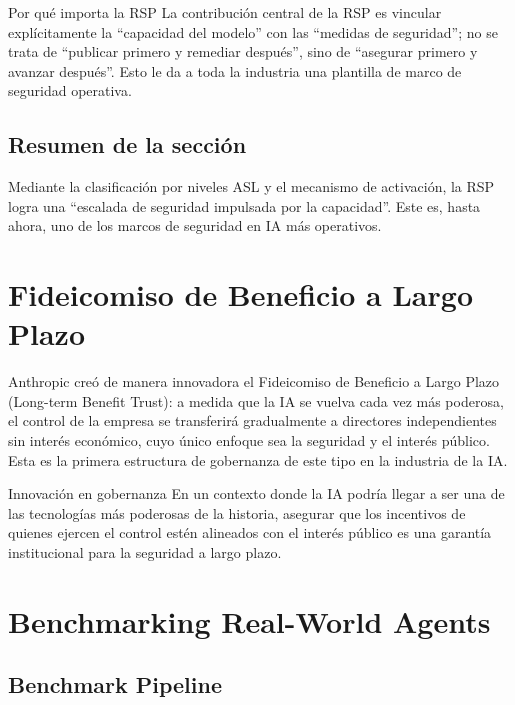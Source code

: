 \documentclass[a4paper]{article}
\begin{document}
\begin{knowledgebox}{Por qué importa la RSP}
La contribución central de la RSP es vincular explícitamente la ``capacidad del modelo'' con las ``medidas de seguridad''; no se trata de ``publicar primero y remediar después'', sino de ``asegurar primero y avanzar después''. Esto le da a toda la industria una plantilla de marco de seguridad operativa.
\end{knowledgebox}

\subsection{Resumen de la sección}

Mediante la clasificación por niveles ASL y el mecanismo de activación, la RSP logra una ``escalada de seguridad impulsada por la capacidad''. Este es, hasta ahora, uno de los marcos de seguridad en IA más operativos.

\section{Fideicomiso de Beneficio a Largo Plazo}

Anthropic creó de manera innovadora el Fideicomiso de Beneficio a Largo Plazo (Long-term Benefit Trust): a medida que la IA se vuelva cada vez más poderosa, el control de la empresa se transferirá gradualmente a directores independientes sin interés económico, cuyo único enfoque sea la seguridad y el interés público. Esta es la primera estructura de gobernanza de este tipo en la industria de la IA.

\begin{importantbox}{Innovación en gobernanza}
En un contexto donde la IA podría llegar a ser una de las tecnologías más poderosas de la historia, asegurar que los incentivos de quienes ejercen el control estén alineados con el interés público es una garantía institucional para la seguridad a largo plazo.
\end{importantbox}

\section{Benchmarking Real-World Agents}

\subsection{Benchmark Pipeline}
\end{document}
